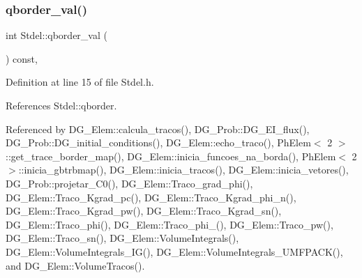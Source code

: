 \subsubsection{\texorpdfstring{qborder\+\_\+val()}{qborder\_val()}}
{\footnotesize\ttfamily int Stdel\+::qborder\+\_\+val (\begin{DoxyParamCaption}{ }\end{DoxyParamCaption}) const\hspace{0.3cm}{\ttfamily [inline]}, {\ttfamily [inherited]}}



Definition at line 15 of file Stdel.\+h.



References Stdel\+::qborder.



Referenced by D\+G\+\_\+\+Elem\+::calcula\+\_\+tracos(), D\+G\+\_\+\+Prob\+::\+D\+G\+\_\+\+E\+I\+\_\+flux(), D\+G\+\_\+\+Prob\+::\+D\+G\+\_\+initial\+\_\+conditions(), D\+G\+\_\+\+Elem\+::echo\+\_\+traco(), Ph\+Elem$<$ 2 $>$\+::get\+\_\+trace\+\_\+border\+\_\+map(), D\+G\+\_\+\+Elem\+::inicia\+\_\+funcoes\+\_\+na\+\_\+borda(), Ph\+Elem$<$ 2 $>$\+::inicia\+\_\+gbtrbmap(), D\+G\+\_\+\+Elem\+::inicia\+\_\+tracos(), D\+G\+\_\+\+Elem\+::inicia\+\_\+vetores(), D\+G\+\_\+\+Prob\+::projetar\+\_\+\+C0(), D\+G\+\_\+\+Elem\+::\+Traco\+\_\+grad\+\_\+phi(), D\+G\+\_\+\+Elem\+::\+Traco\+\_\+\+Kgrad\+\_\+pc(), D\+G\+\_\+\+Elem\+::\+Traco\+\_\+\+Kgrad\+\_\+phi\+\_\+n(), D\+G\+\_\+\+Elem\+::\+Traco\+\_\+\+Kgrad\+\_\+pw(), D\+G\+\_\+\+Elem\+::\+Traco\+\_\+\+Kgrad\+\_\+sn(), D\+G\+\_\+\+Elem\+::\+Traco\+\_\+phi(), D\+G\+\_\+\+Elem\+::\+Traco\+\_\+phi\+\_(), D\+G\+\_\+\+Elem\+::\+Traco\+\_\+pw(), D\+G\+\_\+\+Elem\+::\+Traco\+\_\+sn(), D\+G\+\_\+\+Elem\+::\+Volume\+Integrals(), D\+G\+\_\+\+Elem\+::\+Volume\+Integrals\+\_\+\+I\+G(), D\+G\+\_\+\+Elem\+::\+Volume\+Integrals\+\_\+\+U\+M\+F\+P\+A\+C\+K(), and D\+G\+\_\+\+Elem\+::\+Volume\+Tracos().

